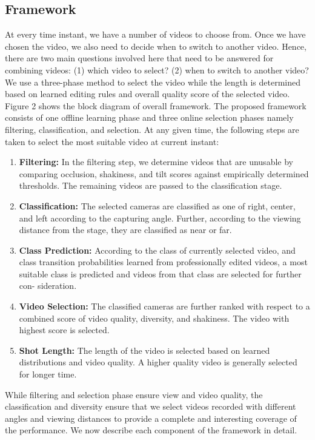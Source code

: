 \documentclass{sig-alternate}
\begin{document}
\subsection{Framework}
At every time instant, we have a number of videos to choose from. Once we have chosen the video, we also need to decide when to switch to another video. Hence, there are two main questions involved here that need to be answered for combining videos: (1) which video to select? (2) when to switch to another video? We use a three-phase method to select the video while the length is determined based on learned editing rules and overall quality score of the selected video. 
Figure 2 shows the block diagram of overall framework. The proposed framework consists of one offline learning phase and three online selection phases namely filtering, classification, and selection. At any given time, the following steps are taken to select the most suitable video at current instant:
\begin{enumerate}
\item \textbf{Filtering:} In the filtering step, we determine videos that are unusable by comparing occlusion, shakiness, and tilt scores against empirically determined thresholds. The remaining videos are passed to the classification stage.
\item \textbf{Classification:} The selected cameras are classified as one of right, center, and left according to the capturing angle. Further, according to the viewing distance from the stage, they are classified as near or far.
\item \textbf{Class Prediction:} According to the class of currently selected video, and class transition probabilities learned from professionally edited videos, a most suitable class is predicted and videos from that class are selected for further con-
sideration.
\item \textbf{Video Selection:} The classified cameras are further ranked with respect to a combined score of video quality, diversity, and shakiness. The video with highest score is selected.
\item \textbf{Shot Length:} The length of the video is selected based on learned distributions and video quality. A higher quality video is generally selected for longer time.
\end{enumerate}
While filtering and selection phase ensure view and video quality, the classification and diversity ensure that we select videos recorded with different angles and viewing distances to provide a complete and interesting coverage of the performance. We now describe each component of the framework in detail.
\end{document}
